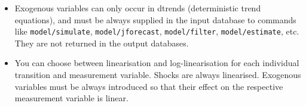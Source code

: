 \begin{itemize}
\item
  Exogenous variables can only occur in dtrends (deterministic trend
  equations), and must be always supplied in the input database to
  commands like \texttt{model/simulate}, \texttt{model/jforecast},
  \texttt{model/filter}, \texttt{model/estimate}, etc. They are not
  returned in the output databases.
\item
  You can choose between linearisation and log-linearisation for each
  individual transition and measurement variable. Shocks are always
  linearised. Exogenous variables must be always introduced so that
  their effect on the respective measurement variable is linear.
\end{itemize}



